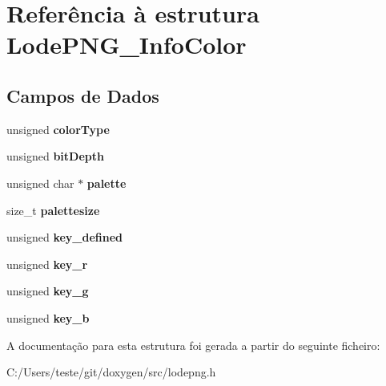 \hypertarget{struct_lode_p_n_g___info_color}{\section{Referência à estrutura Lode\-P\-N\-G\-\_\-\-Info\-Color}
\label{struct_lode_p_n_g___info_color}
}
\subsection*{Campos de Dados}
\begin{DoxyCompactItemize}
\item 
\hypertarget{struct_lode_p_n_g___info_color_a16155a24a5416612848168557aedb3f7}{unsigned {\bfseries color\-Type}}\label{struct_lode_p_n_g___info_color_a16155a24a5416612848168557aedb3f7}

\item 
\hypertarget{struct_lode_p_n_g___info_color_af8408d26f49644b872a5ae8ec6ee6026}{unsigned {\bfseries bit\-Depth}}\label{struct_lode_p_n_g___info_color_af8408d26f49644b872a5ae8ec6ee6026}

\item 
\hypertarget{struct_lode_p_n_g___info_color_a874996f145fbbb66344682ea66e29aad}{unsigned char $\ast$ {\bfseries palette}}\label{struct_lode_p_n_g___info_color_a874996f145fbbb66344682ea66e29aad}

\item 
\hypertarget{struct_lode_p_n_g___info_color_ad9923bee8bdaa85a3efdca8192351e31}{size\-\_\-t {\bfseries palettesize}}\label{struct_lode_p_n_g___info_color_ad9923bee8bdaa85a3efdca8192351e31}

\item 
\hypertarget{struct_lode_p_n_g___info_color_a13a45586bf7b983ec8dca6784edf26f4}{unsigned {\bfseries key\-\_\-defined}}\label{struct_lode_p_n_g___info_color_a13a45586bf7b983ec8dca6784edf26f4}

\item 
\hypertarget{struct_lode_p_n_g___info_color_af7be991db500f2892d3aa6d0e0beea9a}{unsigned {\bfseries key\-\_\-r}}\label{struct_lode_p_n_g___info_color_af7be991db500f2892d3aa6d0e0beea9a}

\item 
\hypertarget{struct_lode_p_n_g___info_color_a0831d86bc165c7de67874180efd6391f}{unsigned {\bfseries key\-\_\-g}}\label{struct_lode_p_n_g___info_color_a0831d86bc165c7de67874180efd6391f}

\item 
\hypertarget{struct_lode_p_n_g___info_color_a96d1683a8dcf2c75a92e3e66299688b0}{unsigned {\bfseries key\-\_\-b}}\label{struct_lode_p_n_g___info_color_a96d1683a8dcf2c75a92e3e66299688b0}

\end{DoxyCompactItemize}


A documentação para esta estrutura foi gerada a partir do seguinte ficheiro\-:\begin{DoxyCompactItemize}
\item 
C\-:/\-Users/teste/git/doxygen/src/lodepng.\-h\end{DoxyCompactItemize}
